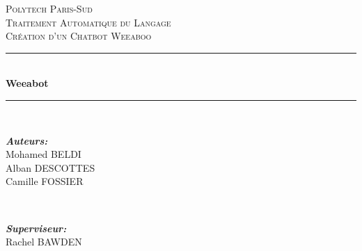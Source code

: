 \documentclass[paper=a4, fontsize=11pt]{article}
\begin{document}
\begin{titlepage}
		
		\newcommand{\HRule}{\rule{\linewidth}{0.5mm}} %
		
		\center %
		
		
		\textsc{\LARGE Polytech Paris-Sud}\\[1.5cm] %
		\textsc{\Large Traitement Automatique du Langage }\\[0.5cm] %
		\textsc{\large Création d'un Chatbot Weeaboo}\\[0.5cm] %
		
		
		\HRule \\[0.65cm]
		{ \huge \bfseries Weeabot}\\[0.4cm] 
		\HRule \\[1.5cm]
		
		
		\begin{minipage}{0.4\textwidth}
			\begin{flushleft} \large
			\vspace{1.2cm}
				\emph{\textbf{Auteurs:}}\\
				Mohamed \textsc{BELDI}\\
				Alban \textsc{DESCOTTES}\\ 
				Camille \textsc{FOSSIER}\\ 
			\end{flushleft}
		\end{minipage}
		~
		\begin{minipage}{0.4\textwidth}
			\begin{flushright} \large
				\emph{\textbf{Superviseur:}} \\
				Rachel \textsc{BAWDEN} %
			\end{flushright}
		\end{minipage}\\[3cm]
		

\end{titlepage}
\end{document}
